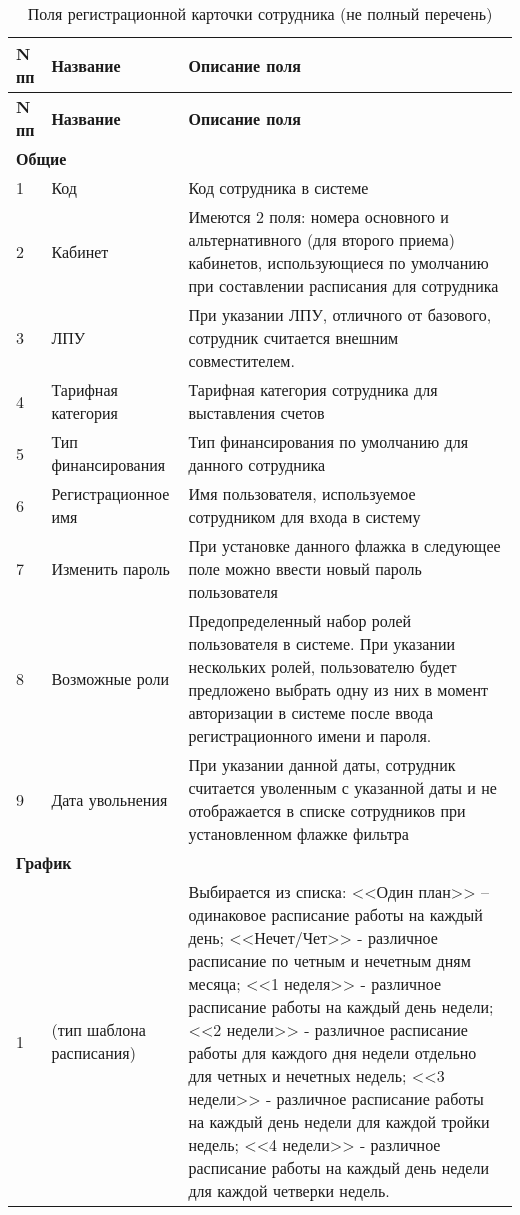 {\small
\begin{longtable}{|p{0.55cm}|p{4cm}|p{12cm}|}
\caption{Поля регистрационной карточки сотрудника (не полный перечень) \label{tbl_spr_perscard}} \\
\hline \rule{0pt}{15pt} \centering \textbf{N пп} & \centering \textbf{Название} & \hfil \textbf{Описание поля} \\ \hline
\endfirsthead
\hline \rule{0pt}{15pt} \centering \textbf{N пп} & \centering \textbf{Название} & \hfil \textbf{Описание поля} \\ \hline
\endhead
\multicolumn{3}{|l|}{\textbf{Общие}} \\ \hline
1	&  Код	& Код сотрудника в системе \\ \hline
2	& Кабинет	& Имеются 2 поля: номера основного и альтернативного (для второго приема) кабинетов, использующиеся по умолчанию при составлении расписания для сотрудника \\ \hline
3	& ЛПУ	& При указании ЛПУ, отличного от базового, сотрудник считается внешним совместителем. \\ \hline
4	& Тарифная категория	& Тарифная категория сотрудника для выставления счетов \\ \hline
5	& Тип финансирования	& Тип финансирования по умолчанию для данного сотрудника \\ \hline
6	& Регистрационное имя	& Имя пользователя, используемое сотрудником для входа в систему \\ \hline
7 &	Изменить пароль &	При установке данного флажка в следующее поле можно ввести новый пароль пользователя \\ \hline
8	& Возможные роли	& Предопределенный набор ролей пользователя в системе. При указании нескольких ролей, пользователю будет предложено выбрать одну из них в момент авторизации в системе после ввода регистрационного имени и пароля. \\ \hline
9	& Дата увольнения	& При указании данной даты, сотрудник считается уволенным с указанной даты и не отображается в списке сотрудников при установленном флажке фильтра \dm{Только работающие} \\ \hline
\multicolumn{3}{|l|}{\textbf{График}} \\ \hline
1	& (тип шаблона расписания)	& Выбирается из списка: <<Один план>> – одинаковое расписание работы на каждый день; <<Нечет/Чет>> - различное расписание по четным и нечетным дням месяца; <<1 неделя>> - различное расписание работы на каждый день недели; <<2 недели>> - различное расписание работы для каждого дня недели отдельно для четных и нечетных недель; <<3 недели>> - различное расписание работы на каждый день недели для каждой тройки недель; <<4 недели>> - различное расписание работы на каждый день недели для каждой четверки недель.  \\ \hline

\end{longtable}}
